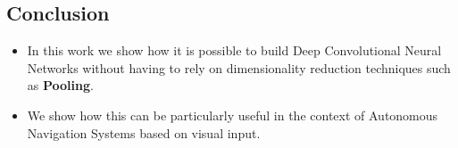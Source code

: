 \documentclass[a0, portrait]{IWIposter}
\begin{document}
\begin{multicols}{3}
\section*{Conclusion}

\begin{itemize}

\item In this work we show how it is possible to build Deep Convolutional Neural Networks without having to rely on dimensionality reduction techniques such as \textbf{Pooling}.
\item We show how this can be particularly useful in the context of Autonomous Navigation Systems based on visual input. 

\end{itemize}





\end{multicols}
\end{document}

